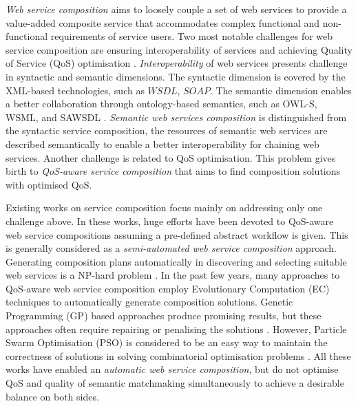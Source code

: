 \documentclass{llncs}
\begin{document}
\textit{Web service composition} aims to loosely couple a set of web services to provide a value-added composite service that accommodates complex functional and non-functional requirements of service users. 
Two most notable challenges for web service composition are ensuring interoperability of services and achieving Quality of Service (QoS) optimisation \cite{fensel2011semantic}. \textit{Interoperability} of web services presents challenge in syntactic and semantic dimensions. The syntactic dimension is covered by the XML-based technologies, such as $WSDL$, $SOAP$. The semantic dimension enables a better collaboration through ontology-based semantics, such as OWL-S, WSML, and SAWSDL \cite{petrie2016web}. \textit{Semantic web services composition} is distinguished from the syntactic service composition, the resources of semantic web services are described semantically to enable a better interoperability for chaining web services. Another challenge is related to QoS optimisation. This problem gives birth to \textit{QoS-aware service composition} that aims to find composition solutions with optimised QoS.

Existing works on service composition focus mainly on addressing only one challenge above. In these works, huge efforts have been devoted to QoS-aware web service compositions assuming a pre-defined abstract workflow is given. This is generally considered as a \textit{semi-automated web service composition} approach. Generating composition plans automatically in discovering and selecting suitable web services is a NP-hard problem \cite{moghaddam2014service}. In the past few years, many approaches \cite{gupta2015optimization,ma2015hybrid,qi2010combining,da2016particle,da2015graphevol,yu2013adaptive} to QoS-aware web service composition employ Evolutionary Computation (EC) techniques to automatically generate composition solutions. Genetic Programming (GP) based approaches produce promising results, but these approaches often require repairing or penalising the solutions \cite{ma2015hybrid,yu2013adaptive}. However, Particle Swarm Optimisation (PSO) is considered to be an easy way to maintain the correctness of solutions in solving combinatorial optimisation problems \cite{da2016particle}. All these works have enabled an \textit{automatic web service composition}, but do not optimise QoS and quality of semantic matchmaking simultaneously to achieve a desirable balance on both sides.  
\end{document}
